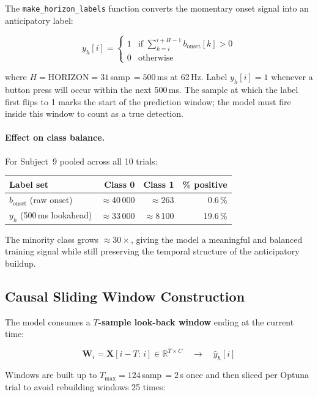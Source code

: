 \documentclass[12pt,a4paper]{article}
\begin{document}
The \texttt{make\_horizon\_labels} function converts the momentary onset
signal into an anticipatory label:

\[
  y_h[i] = \begin{cases}
    1 & \text{if } \sum_{k=i}^{i+H-1} b_{\text{onset}}[k] > 0 \\
    0 & \text{otherwise}
  \end{cases}
\]

where $H = \text{HORIZON} = 31$\,samp\,$= 500$\,ms at 62\,Hz. Label
$y_h[i] = 1$ whenever a button press will occur within the next 500\,ms.
The sample at which the label first flips to 1 marks the start of the
prediction window; the model must fire inside this window to count as a
true detection.

\paragraph{Effect on class balance.} For Subject~9 pooled across all 10
trials:

\begin{center}
\begin{tabular}{lrrr}
\toprule
Label set & Class 0 & Class 1 & \% positive \\
\midrule
$b_{\text{onset}}$ (raw onset) & $\approx$40\,000 & $\approx$263 & 0.6\,\% \\
$y_h$ (500\,ms lookahead) & $\approx$33\,000 & $\approx$8\,100 & 19.6\,\% \\
\bottomrule
\end{tabular}
\end{center}

The minority class grows $\approx\!30\times$, giving the model a
meaningful and balanced training signal while still preserving the temporal
structure of the anticipatory buildup.

\subsection{Causal Sliding Window Construction}

The model consumes a \textbf{$T$-sample look-back window} ending at the
current time:

\[
  \mathbf{W}_i = \mathbf{X}[i-T:\,i] \in \mathbb{R}^{T \times C}
  \quad \longrightarrow \quad
  \hat{y}_h[i]
\]

Windows are built up to $T_{\max} = 124$\,samp\,$= 2$\,s once and then
sliced per Optuna trial to avoid rebuilding windows 25 times:
\end{document}
